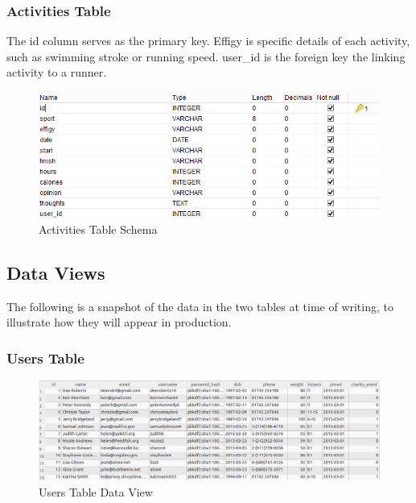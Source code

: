 \documentclass{article}[12pt,a4paper]
\begin{document}
\subsubsection{Activities Table}
The id column serves as the primary key. Effigy is specific details of each activity, such as swimming stroke or running speed. user\_id is the foreign key the linking activity to a runner.
\begin{figure}[h!]
  \includegraphics[scale=0.65]{images/database/activities_schema}
  \caption{Activities Table Schema}
\end{figure}

\clearpage

\subsection{Data Views}
The following is a snapshot of the data in the two tables at time of writing, to illustrate how they will appear in production.

\subsubsection{Users Table}
\begin{figure}[h!]
  \includegraphics[scale=0.37]{images/database/users_visual}
  \caption{Users Table Data View}
\end{figure}
\end{document}
